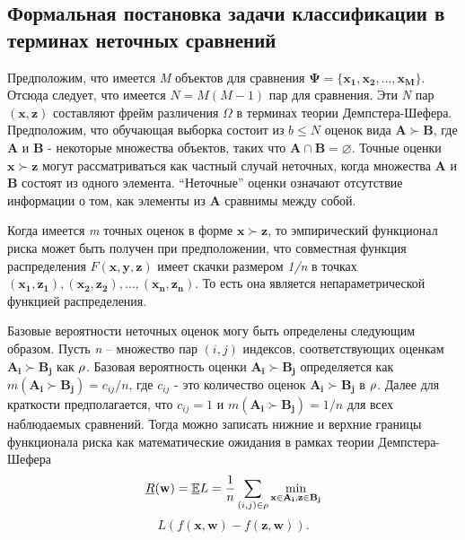 \documentclass[12pt,a4paper,oneside]{article}
\begin{document}
\begin{multicols}{2}
\chapter{Формальная постановка задачи классификации в терминах неточных сравнений}

\par
Предположим, что имеется \emph{M} объектов для сравнения \(\mathbf{\Psi} = \{\mathbf{x_1}, \mathbf{x_2}, \dots, \mathbf{x_M}\}\). 
Отсюда следует, что имеется \(N = M(M - 1)\) пар для сравнения. 
Эти \emph{N} пар \((\mathbf{x}, \mathbf{z})\) составляют фрейм различения \(\Omega\) в терминах теории Демпстера-Шефера. 
Предположим, что обучающая выборка состоит из \(b \leq N\) оценок вида \(\mathbf{A} \succ \mathbf{B}\), где \(\mathbf{A}\) и \(\mathbf{B}\) - некоторые множества объектов, таких что \(\mathbf{A} \cap \mathbf{B} = \varnothing\).  
Точные оценки \(\mathbf{x} \succ \mathbf{z}\) могут рассматриваться как частный случай неточных, когда множества \(\mathbf{A}\) и \(\mathbf{B}\) состоят из одного элемента. 
``Неточные'' оценки означают отсутствие информации о том, как элементы из \(\mathbf{A}\) сравнимы между собой. 

\par 
Когда имеется \emph{m} точных оценок в форме \(\mathbf{x} \succ \mathbf{z}\), то эмпирический функционал риска может быть получен при предположении, что совместная функция распределения \(F(\mathbf{x}, \mathbf{y}, \mathbf{z})\) имеет скачки размером \emph{1/n} в точках \((\mathbf{x_1}, \mathbf{z_1}), (\mathbf{x_2}, \mathbf{z_2}), \dots, (\mathbf{x_n}, \mathbf{z_n})\). 
То есть она является непараметрической функцией распределения. 

\par
Базовые вероятности неточных оценок могу быть определены следующим образом. 
Пусть \emph{n} -- множество пар \((i, j)\) индексов, соответствующих оценкам \(\mathbf{A_i} \succ \mathbf{B_j}\) как \(\mathrm{\rho}\). 
Базовая вероятность оценки \(\mathbf{A_i} \succ \mathbf{B_j}\) определяется как \(m(\mathbf{A_i} \succ \mathbf{B_j}) = c_{ij} / n\), где \(c_{ij}\) - это количество оценок \(\mathbf{A_i} \succ \mathbf{B_j}\) в \(\mathrm{\rho}\). 
Далее для краткости предполагается, что \(c_{ij} = 1\) и \(m(\mathbf{A_i} \succ \mathbf{B_j}) = 1/n\) для всех наблюдаемых сравнений. 
Тогда можно записать нижние и верхние границы функционала риска как математические ожидания в рамках теории Демпстера-Шефера
\[
\underline{R}(\mathbf{w}) = \mathbb{\underline{E}}L = \frac{1}{n} \sum \limits_{(i,j) \in \Rho} \underset{%
\mathbf{x} \in \mathbf{A_i}, \mathbf{z} \in \mathbf{B_j}%
}{\operatorname{min}}\]
\[
L(f(\mathbf{x}, \mathbf{w}) - f(\mathbf{z}, \mathbf{w})).
\]


\end{multicols}
\end{document}
